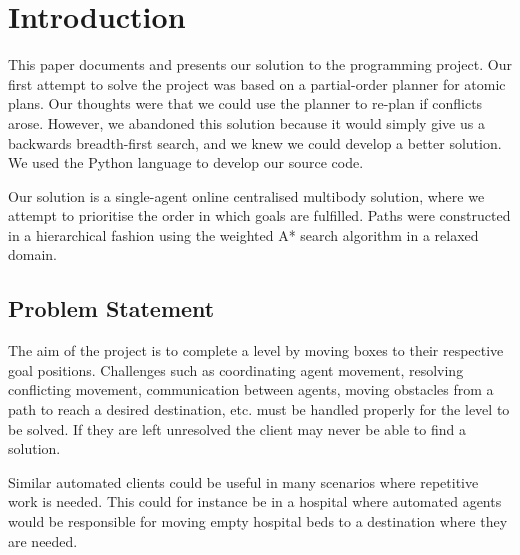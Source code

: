 \section{Introduction}
\label{sec:introduction}


This paper documents and presents our solution to the programming project.
Our first attempt to solve the project was based on a partial-order planner for atomic plans.
Our thoughts were that we could use the planner to re-plan if conflicts arose.
However, we abandoned this solution because it would simply give us a backwards breadth-first search, and we knew we could develop a better solution.
We used the Python language to develop our source code.

Our solution is a single-agent online centralised multibody solution, where we attempt to prioritise the order in which goals are fulfilled.
Paths were constructed in a hierarchical fashion using the weighted A* search algorithm in a relaxed domain.

\subsection{Problem Statement}

The aim of the project is to complete a level by moving boxes to their respective goal positions.
Challenges such as coordinating agent movement, resolving conflicting movement, communication between agents, moving obstacles from a path to reach a desired destination, etc. must be handled properly for the level to be solved.
If they are left unresolved the client may never be able to find a solution.

Similar automated clients could be useful in many scenarios where repetitive work is needed.
This could for instance be in a hospital where automated agents would be responsible for moving empty hospital beds to a destination where they are needed.




